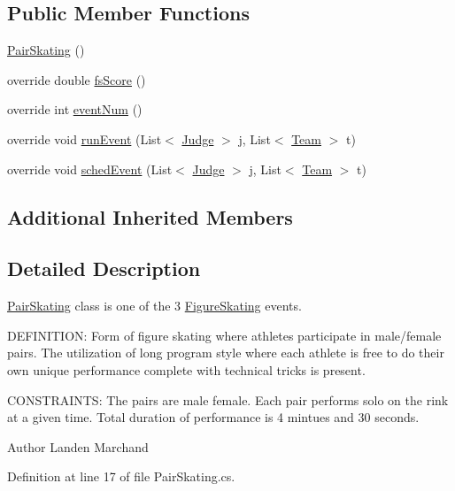 \subsection*{Public Member Functions}
\begin{DoxyCompactItemize}
\item 
\hyperlink{classPCO_1_1PairSkating_afcb237a5c3a41d42ebe8902b5ef2a4ec}{Pair\+Skating} ()
\item 
override double \hyperlink{classPCO_1_1PairSkating_aaab23d1dec6f01ef77ec808be48d6b75}{fs\+Score} ()
\item 
override int \hyperlink{classPCO_1_1PairSkating_aaf3cda572c411560ddc8f2f44621ff18}{event\+Num} ()
\item 
override void \hyperlink{classPCO_1_1PairSkating_adc75a58b22ce9edd905cbbe06320c9a1}{run\+Event} (List$<$ \hyperlink{classPCO_1_1Judge}{Judge} $>$ j, List$<$ \hyperlink{classPCO_1_1Team}{Team} $>$ t)
\item 
override void \hyperlink{classPCO_1_1PairSkating_a7da01fe6e5c700bc232189087fddf450}{sched\+Event} (List$<$ \hyperlink{classPCO_1_1Judge}{Judge} $>$ j, List$<$ \hyperlink{classPCO_1_1Team}{Team} $>$ t)
\end{DoxyCompactItemize}
\subsection*{Additional Inherited Members}


\subsection{Detailed Description}
\hyperlink{classPCO_1_1PairSkating}{Pair\+Skating} class is one of the 3 \hyperlink{classPCO_1_1FigureSkating}{Figure\+Skating} events. 

D\+E\+F\+I\+N\+I\+T\+I\+O\+N\+: Form of figure skating where athletes participate in male/female pairs. The utilization of long program style where each athlete is free to do their own unique performance complete with technical tricks is present.

C\+O\+N\+S\+T\+R\+A\+I\+N\+T\+S\+: The pairs are male female. Each pair performs solo on the rink at a given time. Total duration of performance is 4 mintues and 30 seconds.\begin{DoxyAuthor}{Author}
Landen Marchand 
\end{DoxyAuthor}


Definition at line 17 of file Pair\+Skating.\+cs.



